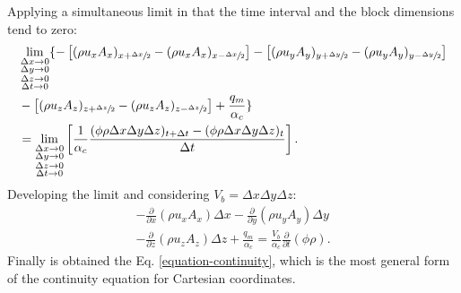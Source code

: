 %
Applying a simultaneous limit in that the time interval and the block dimensions tend to zero:
%
\begin{align}\nonumber
	\label{equation-mass-conservation-limit}
	& \lim_{\substack{\Delta x \to 0 \\ \Delta y \to 0 \\ \Delta z \to 0 \\ \Delta t \to 0}} \{
	-\left[(\rho u_x A_x)_{x+\sfrac{\Delta x}{2}}-(\rho u_x A_x)_{x-\sfrac{\Delta x}{2}} \right]
	-\left[(\rho u_y A_y)_{y+\sfrac{\Delta y}{2}}-(\rho u_y A_y)_{y-\sfrac{\Delta y}{2}}\right] \\ \nonumber
	& - \left[(\rho u_z A_z)_{z+\sfrac{\Delta z}{2}}-(\rho 	u_z A_z)_{z-\sfrac{\Delta z}{2}}\right]
	+ \frac{q_m}{\alpha_c} \} \\
	& = \lim_{\substack{\Delta x \to 0 \\ \Delta y \to 0 \\ \Delta z \to 0 \\ \Delta t \to 0}} \left[\frac{1}{\alpha_c}\frac{(\phi \rho \Delta x \Delta y \Delta z)_{t+\Delta t}-(\phi \rho \Delta x \Delta y \Delta z)_{t}}{\Delta t}\right] .
\end{align}
%
Developing the limit and considering $V_b=\Delta x \Delta y \Delta z$:
%
\begin{multline}
	\label{equation-continuity}
	-\frac{\partial}{\partial x}(\rho u_x A_x)\Delta x - \frac{\partial}{\partial y}(\rho u_y A_y)\Delta y \\
	- \frac{\partial}{\partial z}(\rho u_z A_z)\Delta z + \frac {q_m}{\alpha_c} = \frac {V_b}{\alpha_c}\frac{\partial}{\partial t}(\phi \rho).
\end{multline}
%
Finally is obtained the Eq. \ref{equation-continuity}, which is the most general form of the continuity equation for Cartesian coordinates.
%
